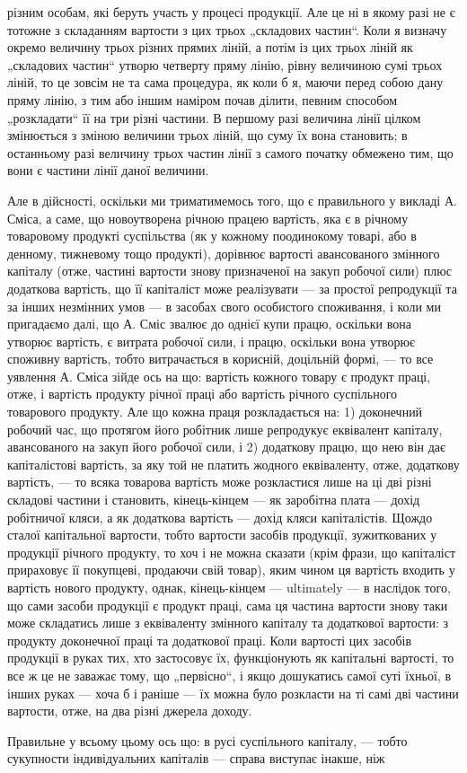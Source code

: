 \parcont{}  %
різним особам, які беруть участь у процесі продукції. Але це ні в якому
разі не є тотожне з складанням вартости з цих трьох „складових частин“.
Коли я визначу окремо величину трьох різних прямих ліній, а
потім із цих трьох ліній як „складових частин“ утворю четверту пряму
лінію, рівну величиною сумі трьох ліній, то це зовсім не та сама процедура,
як коли б я, маючи перед собою дану пряму лінію, з тим або
іншим наміром почав ділити, певним способом „розкладати“ її на три
різні частини. В першому разі величина лінії цілком змінюється з зміною
величини трьох ліній, що суму їх вона становить; в останньому разі
величину трьох частин лінії з самого початку обмежено тим, що вони
є частини лінії даної величини.

Але в дійсності, оскільки ми триматимемось того, що є правильного
у викладі А. Сміса, а саме, що новоутворена річною працею вартість,
яка є в річному товаровому продукті суспільства (як у кожному поодинокому
товарі, або в денному, тижневому тощо продукті), дорівнює вартості
авансованого змінного капіталу (отже, частині вартости знову призначеної
на закуп робочої сили) плюс додаткова вартість, що її капіталіст може
реалізувати — за простої репродукції та за інших незмінних умов — в засобах
свого особистого споживання, і коли ми пригадаємо далі, що А.
Сміс звалює до однієї купи працю, оскільки вона утворює вартість, є
витрата робочої сили, і працю, оскільки вона утворює споживну вартість,
тобто витрачається в корисній, доцільній формі, — то все уявлення
А. Сміса зійде ось на що: вартість кожного товару є продукт праці,
отже, і вартість продукту річної праці або вартість річного суспільного
товарового продукту. Але що кожна праця розкладається на: 1) доконечний
робочий час, що протягом його робітник лише репродукує еквівалент
капіталу, авансованого на закуп його робочої сили, і 2) додаткову працю,
що нею він дає капіталістові вартість, за яку той не платить жодного
еквіваленту, отже, додаткову вартість, — то всяка товарова вартість може
розкластися лише на ці дві різні складові частини і становить, кінець-кінцем —
як заробітна плата — дохід робітничої кляси, а як додаткова вартість —
дохід кляси капіталістів. Щождо сталої капітальної вартости, тобто вартости
засобів продукції, зужиткованих у продукції річного продукту, то
хоч і не можна сказати (крім фрази, що капіталіст прираховує її покупцеві,
продаючи свій товар), яким чином ця вартість входить у вартість
нового продукту, однак, кінець-кінцем — ultimately — в наслідок того, що
сами засоби продукції є продукт праці, сама ця частина вартости знову
таки може складатись лише з еквіваленту змінного капіталу та додаткової
вартости: з продукту доконечної праці та додаткової праці. Коли
вартості цих засобів продукції в руках тих, хто застосовує їх, функціонують
як капітальні вартості, то все ж це не заважає тому, що „первісно“,
і якщо дошукатись самої суті їхньої, в інших руках — хоча б і раніше — їх
можна було розкласти на ті самі дві частини вартости, отже, на два
різні джерела доходу.

Правильне у всьому цьому ось що: в русі суспільного капіталу, —
тобто сукупности індивідуальних капіталів — справа виступає інакше, ніж
\parbreak{}  %
